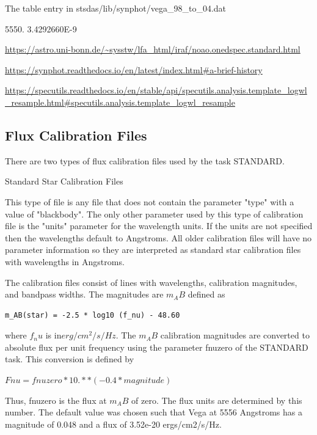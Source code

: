 The table entry in stsdas/lib/synphot/vega\_98\_to\_04.dat

          5550.     3.4292660E-9

\url{https://astro.uni-bonn.de/~sysstw/lfa_html/iraf/noao.onedspec.standard.html}

\url{https://synphot.readthedocs.io/en/latest/index.html#a-brief-history}

\url{https://specutils.readthedocs.io/en/stable/api/specutils.analysis.template_logwl_resample.html#specutils.analysis.template_logwl_resample}

\subsection{Flux Calibration Files}

There are two types of flux calibration files used by the task
STANDARD.

Standard Star Calibration Files

This type of file is any file that does not contain the parameter
"type" with a value of "blackbody". The only other parameter used by
this type of calibration file is the "units" parameter for the
wavelength units. If the units are not specified then the wavelengths
default to Angstroms. All older calibration files will have no
parameter information so they are interpreted as standard star
calibration files with wavelengths in Angstroms.

The calibration files consist of lines with wavelengths, calibration
magnitudes, and bandpass widths. The magnitudes are $m_AB$ defined as

\begingroup \fontsize{10pt}{10pt}
\selectfont
\begin{verbatim} 
m_AB(star) = -2.5 * log10 (f_nu) - 48.60
\end{verbatim}
\endgroup

where $f_nu$ is in$ erg/cm^2/s/Hz$. The $m_AB$ calibration magnitudes are
converted to absolute flux per unit frequency using the parameter
fnuzero of the STANDARD task. This conversion is defined by

$Fnu = fnuzero * 10. ** (-0.4 * magnitude)$

Thus, fnuzero is the flux at $m_AB$ of zero. The flux units are
determined by this number. The default value was chosen such that Vega
at 5556 Angstroms has a magnitude of 0.048 and a flux of 3.52e-20
ergs/cm2/s/Hz.

